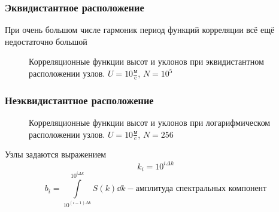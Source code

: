 \documentclass[10pt,pdf,hyperref={unicode}, dvipsnames]{beamer}
\begin{document}
\begin{frame}[t]\frametitle{Эквидистантное расположение}
	При очень большом числе гармоник период функций корреляции всё ещё недостаточно большой
	\begin{figure}[h!]
		\vfill
		\begin{minipage}{0.49\textheight}
				\centering
		\end{minipage}
		\hfill
		\begin{minipage}{0.49\linewidth}
				\centering
		\end{minipage}
		\caption{Корреляционные функции высот и уклонов при эквидистантном расположении узлов. $U=10 \frac{\text{м}}{\text{c}}$, $N=10^5$}
		\label{fig:ca05}		


	\end{figure}



\end{frame}


\begin{frame}[t]\frametitle{Неэквидистантное расположение}
    
\begin{figure}[h!]
	\begin{minipage}{0.49\linewidth}
			\centering
			\label{fig:ch1}		
	\end{minipage}
	\hfill
	\begin{minipage}{0.49\linewidth}
			\centering
			\label{fig:ca1}		
	\end{minipage}
	\caption{Корреляционные функции высот и уклонов при логарифмическом расположении узлов. $U=10 \frac{\text{м}}{\text{c}}$, $N=256$}
\end{figure}
	Узлы задаются выражением
	\begin{equation}
		k_i=10^{i \Delta k}
	\end{equation}
	\begin{equation*}
	b_i = \int\limits_{10^{(i-1)\Delta k}}^{10^{i \Delta k}} S(k) \dd{k} -
	\text{амплитуда спектральных компонент}
	\end{equation*}

\end{frame}
\end{document}
